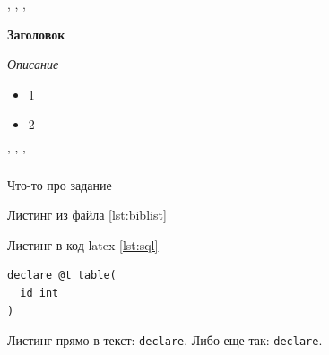 


\tableofcontents


\newpage
\Chapter{\lab\ \labnumber}{\labtheme}{}


\begin{center} , , , \end{center}
\noindent
\textbf{
   Заголовок
}

\textit{
    Описание
}

\begin{itemize}
    \setlength{\itemsep}{0pt} %
    \setlength{\parskip}{0pt}
    \setlength{\parsep}{0pt} 
    \item 1
    \item 2
\end{itemize}

\begin{center} ' ' ' \end{center}

\newpage
{}
Что-то про задание

Листинг из файла \ref{lst:biblist}


Листинг в код latex \ref{lst:sql}
\begin{lstlisting}[caption={SQL},label={lst:sql}]
declare @t table(
  id int
)
\end{lstlisting}

Листинг прямо в текст: \lstinline[columns=fixed]{declare}. Либо еще так: \verb|declare|.

